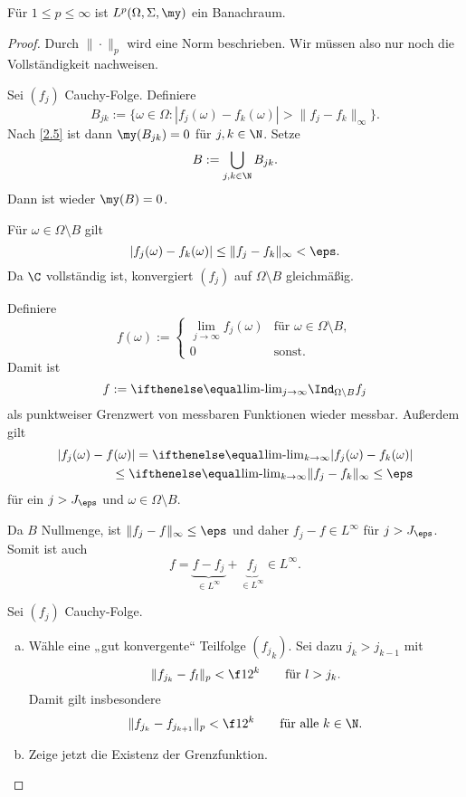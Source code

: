 \begin{st} \label{2.12}
	Für $1 \le p \le \infty$ ist $L^p(\Omega, \Sigma, \my)$ ein Banachraum.
	\begin{proof}
		Durch $\|\cdot\|_p$ wird eine Norm beschrieben.
		Wir müssen also nur noch die Vollständigkeit nachweisen.
		\begin{seg}[$p=\infty$]
			Sei $(f_j)$ Cauchy-Folge.
			Definiere
			\[
				B_{jk} := \Big\{ \omega \in \Omega : |f_j(\omega) - f_k(\omega)| > \|f_j-f_k\|_\infty \Big\}.
			\]
			Nach \ref{2.5} ist dann $\my(B_{jk}) = 0$ für $j,k\in \N$.
			Setze
			\[
				B := \bigcup_{j,k\in \N} B_{jk}.
			\]
			Dann ist wieder $\my(B) = 0$.

			Für $\omega \in \Omega \setminus B$ gilt
			\[
				|f_j(\omega) - f_k(\omega)| \le \|f_j-f_k\|_\infty < \eps.
			\]
			Da $\C$ vollständig ist, konvergiert $(f_j)$ auf $\Omega \setminus B$ gleichmäßig.

			Definiere
			\[
				f(\omega) := \begin{cases}
					\lim\limits_{j \to \infty} f_j(\omega) & \text{für }\omega \in \Omega \setminus B ,\\
					0 & \text{sonst.}
				\end{cases}
			\]
			Damit ist
			\[
				f := \lim_{j\to \infty} \Ind_{\Omega \setminus B} f_j
			\]
			als punktweiser Grenzwert von messbaren Funktionen wieder messbar.
			Außerdem gilt
			\begin{align*}
				|f_j(\omega) - f(\omega) |
				= \lim_{k\to \infty} |f_j(\omega) - f_k(\omega)| \\
				\le \lim_{k\to \infty} \|f_j - f_k\|_{\infty}
				\le \eps
			\end{align*}
			für ein $j > J_\eps$ und $\omega \in \Omega \setminus B$.

			Da $B$ Nullmenge, ist $\|f_j - f\|_\infty \le \eps$ und daher $f_j - f \in L^\infty$ für $j > J_\eps$.
			Somit ist auch
			\[
				f = \underbrace{f - f_j}_{\in L^\infty} + \underbrace{f_j}_{\in L^\infty} \in L^\infty.
			\]
		\end{seg}
		\begin{seg}[$1 \le p < \infty$]
			Sei $(f_j)$ Cauchy-Folge.
			\begin{enumerate}[a)]
				\item
					Wähle eine „gut konvergente“ Teilfolge $({f_j}_k)$.
					Sei dazu $j_k > j_{k-1}$ mit
					\[
						\|f_{j_k} - f_l\|_p < \f 1{2^k} \qquad \text{für $l>j_k$}.
					\]
					Damit gilt insbesondere
					\[
						\|f_{j_k} - f_{j_{k+1}} \|_p < \f 1{2^k} \qquad \text{für alle $k \in \N$}.
					\]
				\item
					Zeige jetzt die Existenz der Grenzfunktion.


\end{enumerate}
\end{seg}
\end{proof}
\end{st}
